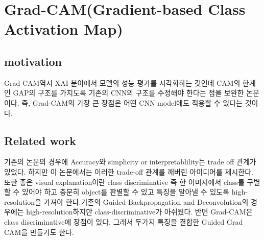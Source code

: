 \documentclass[extendedabs]{bmvc2k}
\begin{document}
\section{Grad-CAM(Gradient-based Class Activation Map)\cite{selvaraju2017grad}}
 \subsection{motivation}
 \quad Grad-CAM역시 XAI 분야에서 모델의 성능 평가를 시각화하는 것인데 CAM의 한계인 GAP의 구조를 가지도록 기존의 CNN의 구조를 수정해야 한다는 점을
 보완한 논문이다. 즉, Grad-CAM의 가장 큰 장점은 어떤 CNN model에도 적용할 수 있다는 것이다. 
 
 \subsection{Related work\cite{youtubeGradCAM}}
 \quad 기존의 논문의 경우에 Accuracy와 simplicity or interpretablility는 trade off 관계가 있었다.
 하지만 이 논문에서는 이러한 trade-off 관계를 깨버린 아이디어를 제시한다. 또한 좋은 visual explanation이란 class discriminative 즉 한 이미지에서 class를 구별할 수 있어야 하고 충분히 object를 판별할 수 있고
 특징을 알아낼 수 있도록 high-resolution을 가져야 한다.기존의 Guided Backpropagation and Deconvolution의 경우에는 high-resolution하지만 class-discriminative가 아쉬웠다. 
 반면 Grad-CAM은 class discriminative에 장점이 있다. 그래서 두가지 특징을 결합한 Guided Grad CAM을 만들기도 한다.
 
\end{document}
